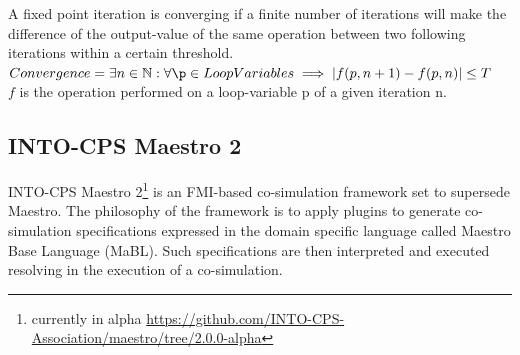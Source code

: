 \begin{definition}\label{def:convergence}
A fixed point iteration is converging if a finite number of iterations will make the difference of the output-value of the same operation between two following iterations within a certain threshold.\\
$Convergence = \exists n \in \setnat: \forall \p \in LoopVariables \implies |f(p, n + 1) - f(p, n)| \leq T$\\
$f$ is the operation performed on a loop-variable p of a given iteration n.
\end{definition}


\subsection{INTO-CPS Maestro 2}
INTO-CPS Maestro 2\footnote{currently in alpha \url{https://github.com/INTO-CPS-Association/maestro/tree/2.0.0-alpha}}\cite{thule_maestro2_2019} is an FMI-based co-simulation framework set to supersede Maestro\cite{Maestro}. The philosophy of the framework is to apply plugins to generate co-simulation specifications expressed in the domain specific language called Maestro Base Language (MaBL). Such specifications are then interpreted and executed resolving in the execution of a co-simulation.
